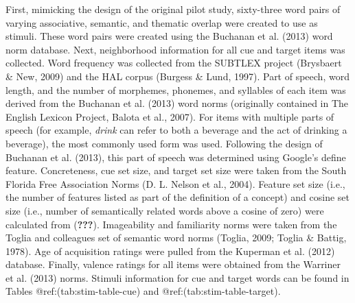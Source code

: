 \documentclass[english,man]{apa6}
\theoremstyle{definition}
\theoremstyle{definition}
\theoremstyle{definition}
\theoremstyle{remark}
\begin{document}
First, mimicking the design of the original pilot study, sixty-three
word pairs of varying associative, semantic, and thematic overlap were
created to use as stimuli. These word pairs were created using the
Buchanan et al. (2013) word norm database. Next, neighborhood
information for all cue and target items was collected. Word frequency
was collected from the SUBTLEX project (Brysbaert \& New, 2009) and the
HAL corpus (Burgess \& Lund, 1997). Part of speech, word length, and the
number of morphemes, phonemes, and syllables of each item was derived
from the Buchanan et al. (2013) word norms (originally contained in The
English Lexicon Project, Balota et al., 2007). For items with multiple
parts of speech (for example, \emph{drink} can refer to both a beverage
and the act of drinking a beverage), the most commonly used form was
used. Following the design of Buchanan et al. (2013), this part of
speech was determined using Google's define feature. Concreteness, cue
set size, and target set size were taken from the South Florida Free
Association Norms (D. L. Nelson et al., 2004). Feature set size (i.e.,
the number of features listed as part of the definition of a concept)
and cosine set size (i.e., number of semantically related words above a
cosine of zero) were calculated from ({\textbf{???}}). Imageability and
familiarity norms were taken from the Toglia and colleagues set of
semantic word norms (Toglia, 2009; Toglia \& Battig, 1978). Age of
acquisition ratings were pulled from the Kuperman et al. (2012)
database. Finally, valence ratings for all items were obtained from the
Warriner et al. (2013) norms. Stimuli information for cue and target
words can be found in Tables @ref:(tab:stim-table-cue) and
@ref:(tab:stim-table-target).
\end{document}
